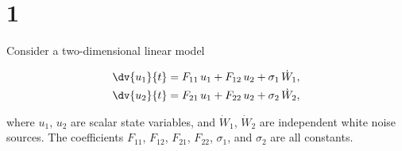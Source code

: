 \section{1}

Consider a two-dimensional linear model

\begin{subequations}
	\begin{align}
		\dv{u_1}{t} &= F_{11}\,u_1 + F_{12}\,u_2 + \sigma_1\,\dot{W}_1, \\
		\dv{u_2}{t} &= F_{21}\,u_1 + F_{22}\,u_2 + \sigma_2\,\dot{W}_2, 
	\end{align}
	\label{eqs:model_1}
\end{subequations}

where $u_1$, $u_2$ are scalar state variables, and $\dot{W}_1$, $\dot{W}_2$ are independent white noise sources. The coefficients $F_{11}$, $F_{12}$, $F_{21}$, $F_{22}$, $\sigma_1$, and $\sigma_2$ are all constants.


